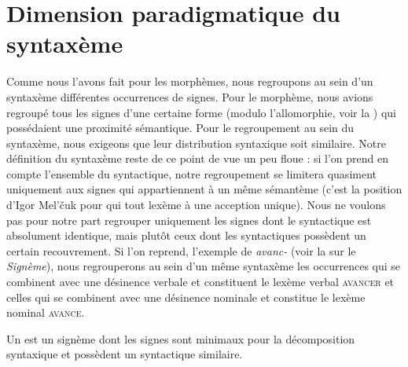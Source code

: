 \section{Dimension paradigmatique du syntaxème}\label{sec:3.1.9}

Comme nous l’avons fait pour les morphèmes, nous regroupons au sein d’un syntaxème différentes occurrences de signes. Pour le morphème, nous avions regroupé tous les signes d’une certaine forme (modulo l’allomorphie, voir la ) qui possédaient une proximité sémantique. Pour le regroupement au sein du syntaxème, nous exigeons que leur distribution syntaxique soit similaire. Notre définition du syntaxème reste de ce point de vue un peu floue : si l’on prend en compte l’ensemble du syntactique, notre regroupement se limitera quasiment uniquement aux signes qui appartiennent à un même sémantème (c’est la position d’Igor Mel’čuk pour qui tout lexème à une acception unique). Nous ne voulons pas pour notre part regrouper uniquement les signes dont le syntactique est absolument identique, mais plutôt ceux dont les syntactiques possèdent un certain recouvrement. Si l’on reprend, l’exemple de \textit{avanc-} (voir la  sur le \textit{Signème}), nous regrouperons au sein d’un même syntaxème les occurrences qui se combinent avec une désinence verbale et constituent le lexème verbal \textsc{avancer} et celles qui se combinent avec une désinence nominale et constitue le lexème nominal \textsc{avance}.\largerpage[-1]

{Un  est un signème dont les signes sont minimaux pour la décomposition syntaxique et possèdent un syntactique similaire.}

